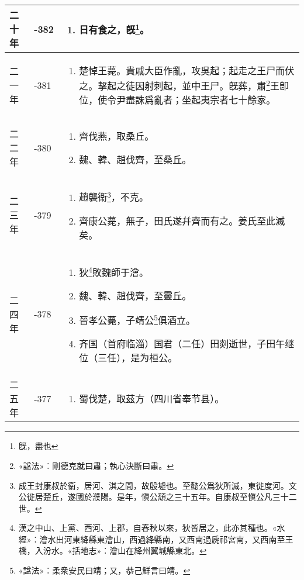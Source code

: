 \begin{longtable}{|>{\centering\scriptsize}m{2em}|>{\centering\scriptsize}m{1.3em}|>{\centering}m{8.8em}|}
  二十年 & -382 & \begin{enumerate}
    \tiny
  \item 日有食之，旣\footnote{旣，盡也}。
  \end{enumerate} \tabularnewline\hline
  二一年 & -381 & \begin{enumerate}
    \tiny
  \item 楚悼王薨。貴戚大臣作亂，攻吳起；起走之王尸而伏之。擊起之徒因射刺起，並中王尸。旣葬，肅\footnote{«諡法»︰剛德克就曰肅；執心決斷曰肅。}王卽位，使令尹盡誅爲亂者；坐起夷宗者七十餘家。
  \end{enumerate} \tabularnewline\hline
  二二年 & -380 & \begin{enumerate}
    \tiny
  \item 齊伐燕，取桑丘。
  \item 魏、韓、趙伐齊，至桑丘。
  \end{enumerate} \tabularnewline\hline
  二三年 & -379 & \begin{enumerate}
    \tiny
  \item 趙襲衞\footnote{成王封康叔於衞，居河、淇之間，故殷墟也。至懿公爲狄所滅，東徙度河。文公徙居楚丘，遂國於濮陽。是年，愼公頹之三十五年。自康叔至愼公凡三十二世。}，不克。
  \item 齊康公薨，無子，田氏遂幷齊而有之。姜氏至此滅矣。
  \end{enumerate} \tabularnewline\hline
  二四年 & -378 & \begin{enumerate}
    \tiny
  \item 狄\footnote{漢之中山、上黨、西河、上郡，自春秋以來，狄皆居之，此亦其種也。«水經»︰澮水出河東絳縣東澮山，西過絳縣南，又西南過虒祁宮南，又西南至王橋，入汾水。«括地志»︰澮山在絳州翼城縣東北。}敗魏師于澮。
  \item 魏、韓、趙伐齊，至靈丘。
  \item 晉孝公薨，子靖公\footnote{«諡法»︰柔衆安民曰靖；又，恭己鮮言曰靖。}俱酒立。
  \item 齐国（首府临淄）国君（二任）田剡逝世，子田午继位（三任），是为桓公。
  \end{enumerate} \tabularnewline\hline
  二五年 & -377 & \begin{enumerate}
    \tiny
  \item 蜀伐楚，取茲方（四川省奉节县）。

\end{enumerate}
\end{longtable}
